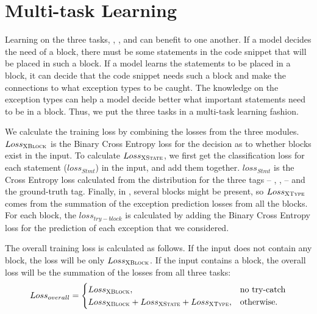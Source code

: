 \section{Multi-task Learning}
\label{sec:multitasking}

Learning on the three tasks, {\xblock}, {\xstate}, and {\xtype}
can benefit to one another. If a model decides the need
of a  block, there must be some statements in the code
snippet that will be placed in such a block. If a model learns the
statements to be placed in a  block, it can decide
that the code snippet needs such a block and make the connections to
what exception types to be caught. The knowledge on the exception
types can help a model decide better what important statements need to
be in a  block. Thus, we put the three tasks
in a multi-task learning fashion.


We calculate the training loss by combining the losses from the three
modules. $Loss_{{\textsc{XBlock}}}$ is the Binary Cross Entropy loss for the
decision as to whether  blocks exist in the input. To
calculate $Loss_{{\textsc{XState}}}$, we first get the classification loss for
each statement ($loss_{Stmt}$) in the input, and add them
together. $loss_{Stmt}$ is the Cross Entropy loss calculated from the
distribution for the three tags -- , ,
 -- and the ground-truth tag. Finally, in \xtype, several
 blocks might be present, so $Loss_{{\textsc{XType}}}$ comes
from the summation of the exception prediction losses from all the
 blocks. For each  block, the
$loss_{try-block}$ is calculated by adding the Binary Cross Entropy
loss for the prediction of each exception that we considered.

The overall training loss is calculated as follows. If the input does
not contain any  block, the loss will be only 
$Loss_{{\textsc{XBlock}}}$. If the input contains a  block,
the overall loss will be the summation of the losses from all
three tasks:
\begin{equation}
\label{eqn:loss}
Loss_{overall} =
\begin{cases}
Loss_{{\textsc{XBlock}}},  & \text{no try-catch}\\
Loss_{{\textsc{XBlock}}} + Loss_{{\textsc{XState}}} + Loss_{{\textsc{XType}}}, &\text{otherwise.}
\end{cases}
\end{equation}
